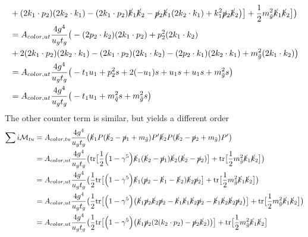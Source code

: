 \documentclass[11pt]{article}
\begin{document}
\begin{flushleft}
\begin{align*}
&  + (2k_1 \cdot p_2)(2k_2 \cdot k_1) - (2k_1 \cdot p_2)\cancel{k}_1\cancel{k}_2 - \cancel{p}_2 \cancel{k}_1(2k_2 \cdot k_1) + k_1^2\cancel{p}_2 \cancel{k}_2 \big) \big] + \frac{1}{2} m_{\tilde{g}}^2 \cancel{k}_1  \cancel{k}_2\big]
  \big)\\
  &=  A_{color, ut} \frac{4 g^4}{u_gt_g} \big(
  -   (2 p_2 \cdot k_2)(2k_1 \cdot p_2) + p_2^2  (2k_1 \cdot k_2) \\
&  + 2(2k_1 \cdot p_2)(2k_2 \cdot k_1) - (2k_1 \cdot p_2)(2k_1 \cdot k_2) - (2 p_2 \cdot k_1)(2k_2 \cdot k_1) 
+  m_{\tilde{g}}^2 (2k_1 \cdot k_2) 
  \big)\\
&=  A_{color, ut} \frac{4 g^4}{u_gt_g} \big(
  -   t_1 u_1 + p_2^2  s  + 2(-u_1)s + u_1s +u_1s 
+  m_{\tilde{g}}^2 s
  \big)\\
  &=  A_{color, ut} \frac{4 g^4}{u_gt_g} \big(
  -   t_1 u_1 + m_{\tilde{q}}^2 s 
+  m_{\tilde{g}}^2 s
  \big)\\
\end{align*}
The other counter term is similar, but yields a different order
\begin{align*}
\sum i \mathcal{M}_{tu} &= A_{color, tu} \frac{4 g^4}{u_gt_g}\big( \cancel{k}_1   P (\cancel{k}_2 - \cancel{p}_1 + m_{\tilde{g}}) P'\cancel{k}_2  P (\cancel{k}_2 -\cancel{p}_2 + m_{\tilde{g}}) P' \big)\\
&= A_{color, ut} \frac{4 g^4}{u_gt_g} \big(
 \text{tr} \big[ \frac{1}{2}\Big(1 - \gamma^5 \Big) \cancel{k}_1 (\cancel{k}_2 - \cancel{p}_1) \cancel{k}_2(\cancel{k}_2-\cancel{p}_2) \big] + \text{tr} \big[\frac{1}{2} m_{\tilde{g}}^2 \cancel{k}_1  \cancel{k}_2\big]
  \big)\\
  &= A_{color, ut} \frac{4 g^4}{u_gt_g} \big(
 \frac{1}{2} \text{tr} \big[\Big(1 - \gamma^5 \Big) \cancel{k}_1 (\cancel{p}_2 - \cancel{k}_1 - \cancel{k}_2) \cancel{k}_2\cancel{p}_2  \big] + \text{tr} \big[\frac{1}{2} m_{\tilde{g}}^2 \cancel{k}_1  \cancel{k}_2\big]
  \big)\\
  &= A_{color, ut} \frac{4 g^4}{u_gt_g} \big(
 \frac{1}{2} \text{tr} \big[\Big(1 - \gamma^5 \Big) \big( \cancel{k}_1 \cancel{p}_2 \cancel{k}_2\cancel{p}_2 - \cancel{k}_1\cancel{k}_1 \cancel{k}_2\cancel{p}_2 - \cancel{k}_1 \cancel{k}_2 \cancel{k}_2\cancel{p}_2  \big)\big] + \text{tr} \big[\frac{1}{2} m_{\tilde{g}}^2 \cancel{k}_1  \cancel{k}_2\big]
  \big)\\
  &= A_{color, ut} \frac{4 g^4}{u_gt_g} \big(
 \frac{1}{2} \text{tr} \big[\Big(1 - \gamma^5 \Big) \big( \cancel{k}_1 \cancel{p}_2 (2 (k_2 \cdot p_2)- \cancel{p}_2\cancel{k}_2)  \big)\big] + \text{tr} \big[\frac{1}{2} m_{\tilde{g}}^2 \cancel{k}_1  \cancel{k}_2\big]

\end{align*}
\end{flushleft}
\end{document}
